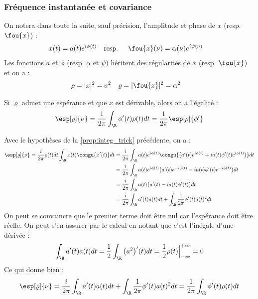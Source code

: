 \subsubsection{Fréquence instantanée et covariance}\label{subsec:freq_instant}

On notera dans toute la suite, sauf précision, l'amplitude et phase de $x$ (resp. $\fou{x}$) :
\begin{align*}
	x(t) &= a(t) e^{i\phi(t)}  &  \text{resp. }\quad \fou{x}(\nu) &= \alpha(\nu) e^{i\psi(\nu)}
\end{align*}
Les fonctions $a$ et $\phi$ (resp. $\alpha$ et $\psi$) héritent des régularités de $x$ (resp. $\fou{x}$) et on a :
\begin{align*}
	\rho &= |x|^2 = a^2  &  \varrho &= |\fou{x}|^2 = \alpha^2
\end{align*}

\begin{proposition}\label{prop.esp_freq}
	Si $\varrho$ admet une espérance et que $x$ est dérivable, alors on a l'égalité :
	\begin{equation}\label{eq:esp_freq}
		\esp[\varrho]{\nu} = \frac{1}{2\pi}\int_\R \phi'(t)\rho(t)dt = \frac{1}{2\pi} \esp[\rho]{\phi'}
	\end{equation}
\end{proposition}

	
\begin{demo} 
	Avec le hypothèses de la \cref{prop:integ_trick} précédente, on a :
	\begin{align*}
		\esp[\varrho]{\nu} = \frac{i}{2\pi} \rho(t)dt\int_\R x(t) \congu{x'(t)} dt &= \frac{i}{2\pi}\int_\R a(t)e^{i\phi(t)}\congu{\big( a'(t)e^{i\phi(t)}+ ia(t)\phi'(t)e^{i\phi(t)} \big)} dt \\
		&= \frac{i}{2\pi}\int_\R a(t)e^{i\phi(t)}\big( a'(t)e^{-i\phi(t)} -ia(t)\phi'(t)e^{-i\phi(t)} \big) dt \\
		&= \frac{i}{2\pi}\int_\R a(t)\big( a'(t)- ia(t)\phi'(t)\big) dt \\
		&= \frac{i}{2\pi}\int_\R a'(t)a(t) dt + \int_\R  \frac{1}{2\pi}\phi'(t)a(t)^2 dt \\
	\end{align*}
	On peut se convaincre que le premier terme doit être nul car l'espérance doit être réelle. On peut s'en assurer par le calcul en notant que c'est l’inégale d'une dérivée :
	\[\int_\R a'(t)a(t) dt = \frac{1}{2} \int_\R \big(a^2\big)'(t) dt = \frac{1}{2}\rho(t)\Big|_{-\infty}^{+\infty} = 0\]
	Ce qui donne bien :
	\[\esp[\varrho]{\nu} = \frac{i}{2\pi}\int_\R a'(t)a(t) dt + \int_\R  \frac{1}{2\pi}\phi'(t)a(t)^2 dt = \frac{1}{2\pi}\int_\R \phi'(t)\rho(t) dt\]
\end{demo}



